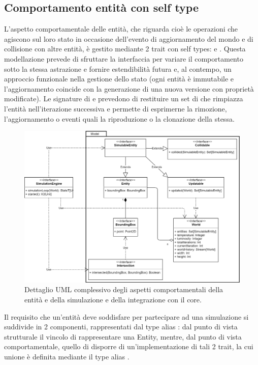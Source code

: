 \subsection{Comportamento entità con self type}
\label{section:self}
L’aspetto comportamentale delle entità, che riguarda cioè le operazioni che agiscono sul loro stato in occasione dell’evento di aggiornamento del mondo e di collisione con altre entità, è gestito mediante 2 trait con self types:  e . Questa modellazione prevede di sfruttare la interfaccia per variare il comportamento sotto la stessa astrazione e fornire estendibilità futura e, al contempo, un approccio funzionale nella gestione dello stato (ogni entità è immutabile e l’aggiornamento coincide con la generazione di una nuova versione con proprietà modificate). Le signature di  e  prevedono di restituire un set di  che rimpiazza l’entità nell’iterazione successiva e permette di esprimerne la rimozione, l’aggiornamento o eventi quali la riproduzione o la clonazione della stessa.

\begin{figure}[h!]
\centering
\includegraphics[width=\textwidth, scale=0.14]{img/Model.png}
\caption{Dettaglio UML complessivo degli aspetti comportamentali della entità e della simulazione e della integrazione con il core. }
\label{fig:model}
\end{figure}

Il requisito che un’entità deve soddisfare per partecipare ad una simulazione si suddivide in 2 componenti, rappresentati dal type alias : dal punto di vista strutturale il vincolo di rappresentare una Entity, mentre, dal punto di vista comportamentale, quello di disporre di un’implementazione di tali 2 trait, la cui unione è definita mediante il type alias .

